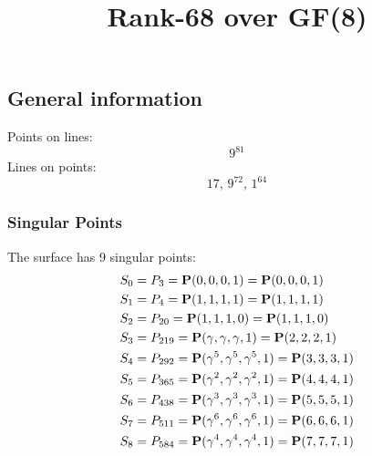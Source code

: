 \documentclass{article}
\newcommand\setTBstruts{\def\T{\rule{0pt}{2.6ex}}%
\def\B{\rule[-1.2ex]{0pt}{0pt}}}
\newcommand{\bP}{{\bf P}}
\begin{document}
 
\setTBstruts



{\allowdisplaybreaks%






\title{Rank-68 over GF(8)}
\author{}%
\maketitle%
%
{}



\subsection*{General information}
Points on lines:
$$
9^{81}$$
Lines on points:
$$
17,\,9^{72},\,1^{64}$$
\subsubsection*{Singular Points}
The surface has 9 singular points:\\
\begin{align*}
S_{0} &= P_{3}=\bP(0, 0, 0, 1) = \bP(0, 0, 0, 1)\\
S_{1} &= P_{4}=\bP(1, 1, 1, 1) = \bP(1, 1, 1, 1)\\
S_{2} &= P_{20}=\bP(1, 1, 1, 0) = \bP(1, 1, 1, 0)\\
S_{3} &= P_{219}=\bP(\gamma , \gamma , \gamma , 1) = \bP(2, 2, 2, 1)\\
S_{4} &= P_{292}=\bP(\gamma^{5}, \gamma^{5}, \gamma^{5}, 1) = \bP(3, 3, 3, 1)\\
S_{5} &= P_{365}=\bP(\gamma^{2}, \gamma^{2}, \gamma^{2}, 1) = \bP(4, 4, 4, 1)\\
S_{6} &= P_{438}=\bP(\gamma^{3}, \gamma^{3}, \gamma^{3}, 1) = \bP(5, 5, 5, 1)\\
S_{7} &= P_{511}=\bP(\gamma^{6}, \gamma^{6}, \gamma^{6}, 1) = \bP(6, 6, 6, 1)\\
S_{8} &= P_{584}=\bP(\gamma^{4}, \gamma^{4}, \gamma^{4}, 1) = \bP(7, 7, 7, 1)\\
\end{align*}
}
\end{document}

